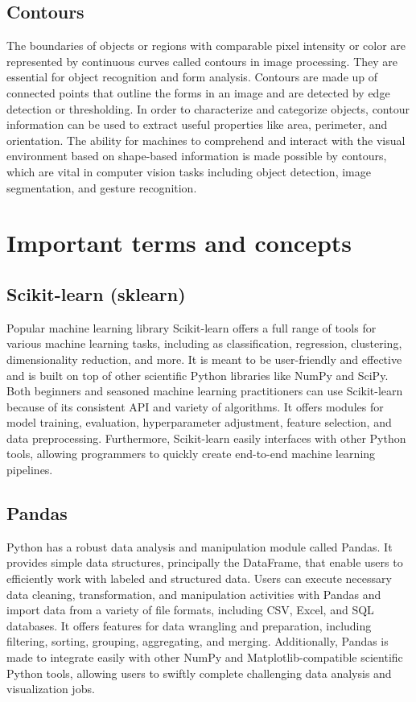 \documentclass[a4paper,12pt]{report}%
\renewcommand{\\}{\vspace*{0.5\baselineskip} \newline}
\begin{document}
\subsection{Contours}
The boundaries of objects or regions with comparable pixel intensity or color are represented by continuous curves called contours in image processing. They are essential for object recognition and form analysis. Contours are made up of connected points that outline the forms in an image and are detected by edge detection or thresholding. In order to characterize and categorize objects, contour information can be used to extract useful properties like area, perimeter, and orientation. The ability for machines to comprehend and interact with the visual environment based on shape-based information is made possible by contours, which are vital in computer vision tasks including object detection, image segmentation, and gesture recognition.



\section{Important terms and concepts}
\subsection{Scikit-learn (sklearn)}
Popular machine learning library Scikit-learn offers a full range of tools for various machine learning tasks, including as classification, regression, clustering, dimensionality reduction, and more. It is meant to be user-friendly and effective and is built on top of other scientific Python libraries like NumPy and SciPy. Both beginners and seasoned machine learning practitioners can use Scikit-learn because of its consistent API and variety of algorithms. It offers modules for model training, evaluation, hyperparameter adjustment, feature selection, and data preprocessing. Furthermore, Scikit-learn easily interfaces with other Python tools, allowing programmers to quickly create end-to-end machine learning pipelines.

\subsection{Pandas}
Python has a robust data analysis and manipulation module called Pandas. It provides simple data structures, principally the DataFrame, that enable users to efficiently work with labeled and structured data. Users can execute necessary data cleaning, transformation, and manipulation activities with Pandas and import data from a variety of file formats, including CSV, Excel, and SQL databases. It offers features for data wrangling and preparation, including filtering, sorting, grouping, aggregating, and merging. Additionally, Pandas is made to integrate easily with other NumPy and Matplotlib-compatible scientific Python tools, allowing users to swiftly complete challenging data analysis and visualization jobs.
\end{document}
